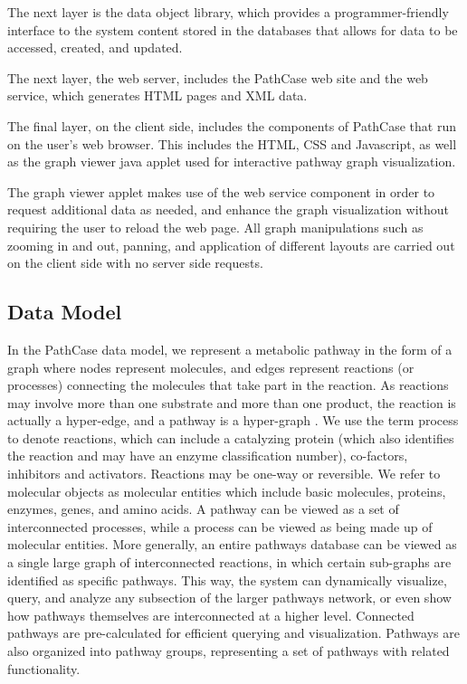 The next layer is the data object library, which provides a programmer-friendly
interface to the system content stored in the databases that allows for data to
be accessed, created, and updated.

The next layer, the web server, includes the PathCase web site and the web
service, which generates HTML pages and XML data.

The final layer, on the client side, includes the components of PathCase that
run on the user’s web browser. This includes the HTML, CSS and Javascript, as
well as the graph viewer java applet used for interactive pathway graph
visualization.

The graph viewer applet makes use of the web service component in order to
request additional data as needed, and enhance the graph visualization without
requiring the user to reload the web page. All graph manipulations such as
zooming in and out, panning, and application of different layouts are carried
out on the client side with no server side requests.

\subsection{Data Model}
\label{sect:pathcase_data_model}

In the PathCase data model, we represent a metabolic pathway \cite{Michal-1999} in
the form of a graph where nodes represent molecules, and edges represent
reactions (or processes) connecting the molecules that take part in the
reaction. As reactions may involve more than one substrate and more than one
product, the reaction is actually a hyper-edge, and a pathway is a hyper-graph
\cite{Berge-1973}. We use the term process to denote reactions, which can include a
catalyzing protein (which also identifies the reaction and may have an enzyme
classification number), co-factors, inhibitors and activators. Reactions may be
one-way or reversible. We refer to molecular objects as molecular entities which
include basic molecules, proteins, enzymes, genes, and amino acids. A pathway
can be viewed as a set of interconnected processes, while a process can be
viewed as being made up of molecular entities. More generally, an entire
pathways database can be viewed as a single large graph of interconnected
reactions, in which certain sub-graphs are identified as specific pathways. This
way, the system can dynamically visualize, query, and analyze any subsection of
the larger pathways network, or even show how pathways themselves are
interconnected at a higher level. Connected pathways are pre-calculated for
efficient querying and visualization. Pathways are also organized into pathway
groups, representing a set of pathways with related functionality. 

